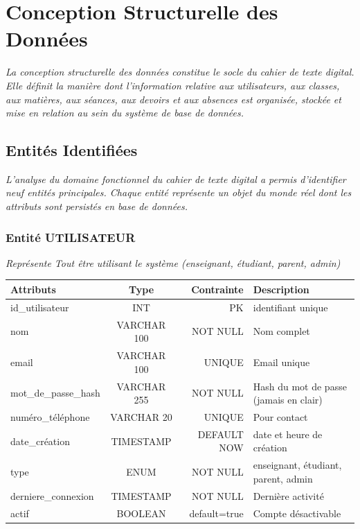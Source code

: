 

\chapter{Conception Structurelle des Données}
\textit{La conception structurelle des données constitue le socle du cahier de texte digital. Elle définit la manière dont l'information relative aux utilisateurs, aux classes, aux matières, aux séances, aux devoirs et aux absences est organisée, stockée et mise en relation au sein du système de base de données.}

\section{Entités Identifiées}

\textit{L'analyse du domaine fonctionnel du cahier de texte digital a permis d'identifier neuf entités principales. Chaque entité représente un objet du monde réel dont les attributs sont persistés en base de données.}


\subsection{Entité UTILISATEUR}

\textit{Représente Tout être utilisant le système (enseignant, étudiant, parent, admin)}

\begin{center}
    
\begin{tabular}{|l|c|r|a|} 
  \hline 
  \textbf{Attributs} & \textbf{Type} & \textbf{Contrainte} & \textbf{Description}\\
  \hline
  id\_utilisateur & INT & PK & identifiant unique \\
  \hline
  nom & VARCHAR 100 & NOT NULL & Nom complet \\
  \hline
  email & VARCHAR 100 & UNIQUE & Email unique \\
  \hline
  mot\_de\_passe\_hash & VARCHAR 255 & NOT NULL & Hash du mot de passe (jamais en clair) \\
  \hline
  numéro\_téléphone & VARCHAR 20 & UNIQUE & Pour contact \\
  \hline
  date\_création & TIMESTAMP & DEFAULT NOW & date et heure de création \\
  \hline
  type & ENUM & NOT NULL & enseignant, étudiant, parent, admin \\
  \hline
  derniere\_connexion & TIMESTAMP & NOT NULL & Dernière activité \\
  \hline
  actif & BOOLEAN & default=true & Compte désactivable \\
  \hline
\end{tabular}
\end{center}

